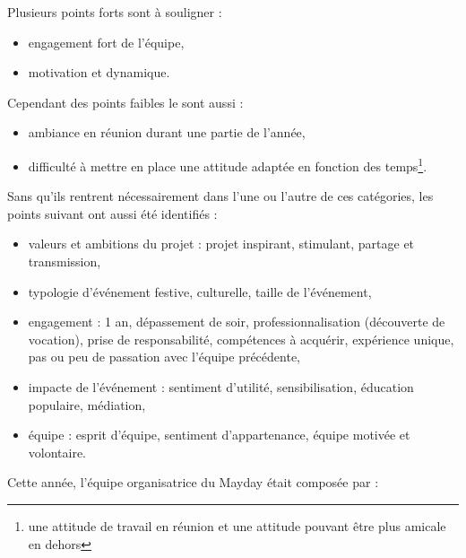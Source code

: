 \documentclass[12pt,a4paper]{report}
\begin{document}
Plusieurs points forts sont à souligner : 
\begin{itemize}
\item engagement fort de l'équipe,
\item motivation et dynamique.\\
\end{itemize}

Cependant des points faibles le sont aussi : 
\begin{itemize}
\item ambiance en réunion durant une partie de l'année,
\item difficulté à mettre en place une attitude adaptée en fonction des temps\footnote{une attitude de travail en réunion et une attitude pouvant être plus amicale en dehors}.\\
\end{itemize}

Sans qu'ils rentrent nécessairement dans l'une ou l'autre de ces catégories, les points suivant ont aussi été identifiés :
\begin{itemize}
\item valeurs et ambitions du projet : projet inspirant, stimulant, partage et transmission,
\item typologie d'événement festive, culturelle, taille de l'événement,
\item engagement : 1 an, dépassement de soir, professionnalisation (découverte de vocation), prise de responsabilité, compétences à acquérir, expérience unique, pas ou peu de passation avec l'équipe précédente,
\item impacte de l'événement : sentiment d'utilité, sensibilisation, éducation populaire, médiation,
\item équipe : esprit d'équipe, sentiment d'appartenance, équipe motivée et volontaire.\\
\end{itemize}

\newpage
Cette année, l'équipe organisatrice du Mayday était composée par :
\end{document}
